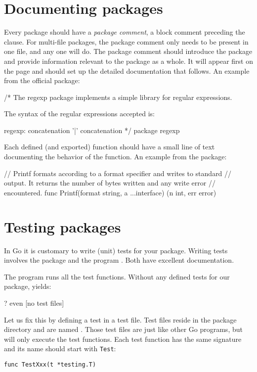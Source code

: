 \section{Documenting packages}
Every package should have a \emph{package comment}, a block comment preceding the
 clause. For multi-file packages, the package comment only needs to be
present in one file, and any one will do. The package comment should introduce
the package and provide information relevant to the package as a whole. It will
appear first on the  page and should set up the detailed documentation
that follows. An example from the official  package:
\begin{display}
/*
    The regexp package implements a simple library for
    regular expressions.

    The syntax of the regular expressions accepted is:

    regexp:
        concatenation { '|' concatenation }
*/
package regexp
\end{display}

Each defined (and exported) function should have a small line of text
documenting the behavior of the function. An example from the 
package:
\begin{display}
// Printf formats according to a format specifier and writes to standard
// output. It returns the number of bytes written and any write error
// encountered.
func Printf(format string, a ...interface{}) (n int, err error)
\end{display}

\section{Testing packages}
In Go it is customary to write (unit) tests for your package. Writing
tests involves the  package and the program
. Both
have excellent documentation. 

The  program runs all the test functions. Without any
defined tests for our  package,  yields:
\begin{display}
\pr {}
?       even    [no test files]
\end{display}
Let us fix this by defining a test in a test file. Test files reside
in the package directory and are named . Those test
files are just like other Go programs, but  will only
execute the test functions.
Each test function has the same signature and its name should start
with \lstinline{Test}:
\begin{lstlisting}
func TestXxx(t *testing.T)
\end{lstlisting}


